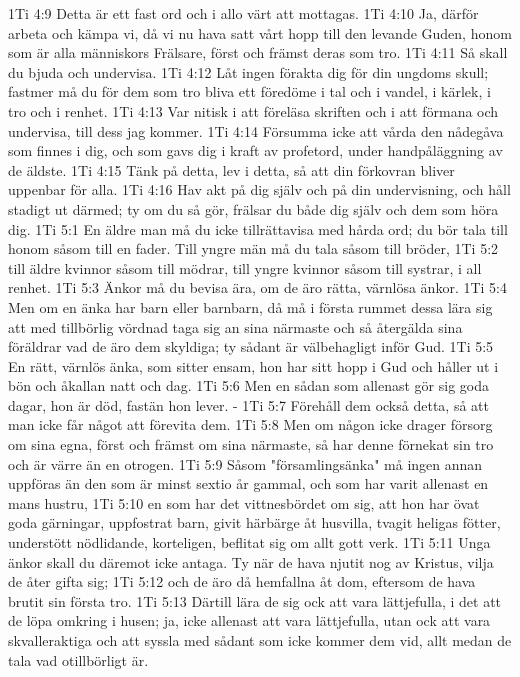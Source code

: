 1Ti 4:9  Detta är ett fast ord och i allo värt att mottagas.
1Ti 4:10  Ja, därför arbeta och kämpa vi, då vi nu hava satt vårt hopp till den levande Guden, honom som är alla människors Frälsare, först och främst deras som tro.
1Ti 4:11  Så skall du bjuda och undervisa.
1Ti 4:12  Låt ingen förakta dig för din ungdoms skull; fastmer må du för dem som tro bliva ett föredöme i tal och i vandel, i kärlek, i tro och i renhet.
1Ti 4:13  Var nitisk i att föreläsa skriften och i att förmana och undervisa, till dess jag kommer.
1Ti 4:14  Försumma icke att vårda den nådegåva som finnes i dig, och som gavs dig i kraft av profetord, under handpåläggning av de äldste.
1Ti 4:15  Tänk på detta, lev i detta, så att din förkovran bliver uppenbar för alla.
1Ti 4:16  Hav akt på dig själv och på din undervisning, och håll stadigt ut därmed; ty om du så gör, frälsar du både dig själv och dem som höra dig.
1Ti 5:1  En äldre man må du icke tillrättavisa med hårda ord; du bör tala till honom såsom till en fader. Till yngre män må du tala såsom till bröder,
1Ti 5:2  till äldre kvinnor såsom till mödrar, till yngre kvinnor såsom till systrar, i all renhet.
1Ti 5:3  Änkor må du bevisa ära, om de äro rätta, värnlösa änkor.
1Ti 5:4  Men om en änka har barn eller barnbarn, då må i första rummet dessa lära sig att med tillbörlig vördnad taga sig an sina närmaste och så återgälda sina föräldrar vad de äro dem skyldiga; ty sådant är välbehagligt inför Gud.
1Ti 5:5  En rätt, värnlös änka, som sitter ensam, hon har sitt hopp i Gud och håller ut i bön och åkallan natt och dag.
1Ti 5:6  Men en sådan som allenast gör sig goda dagar, hon är död, fastän hon lever. -
1Ti 5:7  Förehåll dem också detta, så att man icke får något att förevita dem.
1Ti 5:8  Men om någon icke drager försorg om sina egna, först och främst om sina närmaste, så har denne förnekat sin tro och är värre än en otrogen.
1Ti 5:9  Såsom "församlingsänka" må ingen annan uppföras än den som är minst sextio år gammal, och som har varit allenast en mans hustru,
1Ti 5:10  en som har det vittnesbördet om sig, att hon har övat goda gärningar, uppfostrat barn, givit härbärge åt husvilla, tvagit heligas fötter, understött nödlidande, korteligen, beflitat sig om allt gott verk.
1Ti 5:11  Unga änkor skall du däremot icke antaga. Ty när de hava njutit nog av Kristus, vilja de åter gifta sig;
1Ti 5:12  och de äro då hemfallna åt dom, eftersom de hava brutit sin första tro.
1Ti 5:13  Därtill lära de sig ock att vara lättjefulla, i det att de löpa omkring i husen; ja, icke allenast att vara lättjefulla, utan ock att vara skvalleraktiga och att syssla med sådant som icke kommer dem vid, allt medan de tala vad otillbörligt är.

